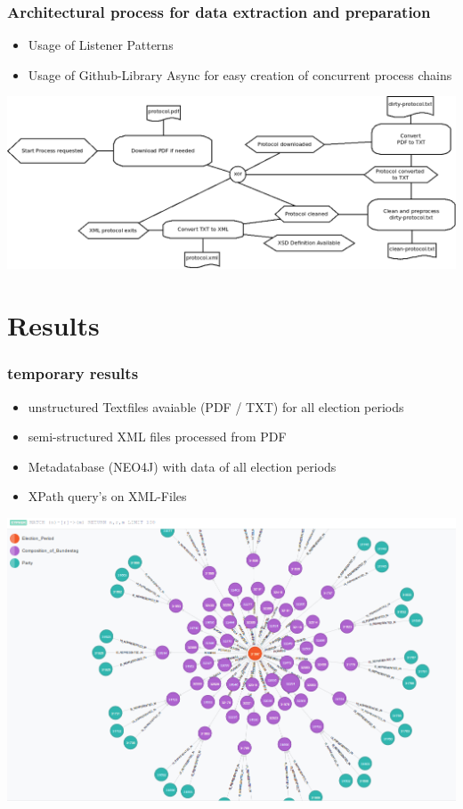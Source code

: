 \documentclass[11pt, a4paper]{beamer}
\begin{document}
\begin{frame}
  \frametitle{Architectural process for data extraction and preparation}
  \begin{itemize}
  \item Usage of Listener Patterns \cite{javainsel9}
  \item Usage of Github-Library Async \cite{async} for easy creation of concurrent process chains
  \end{itemize}  
  \begin{center}
    \includegraphics[width=1\textwidth]{../../doc/process-overview.png}
  \end{center}
\end{frame}


\section{Results}
\begin{frame}
\frametitle{temporary results}
\begin{itemize}
\item unstructured Textfiles avaiable (PDF / TXT) for all election periods
\item semi-structured XML files processed from PDF
\item Metadatabase (NEO4J) with data of all election periods
\item XPath query's on XML-Files
\end{itemize}
\includegraphics[scale=0.25]{metadatabase.png}
\end{frame}
\end{document}
